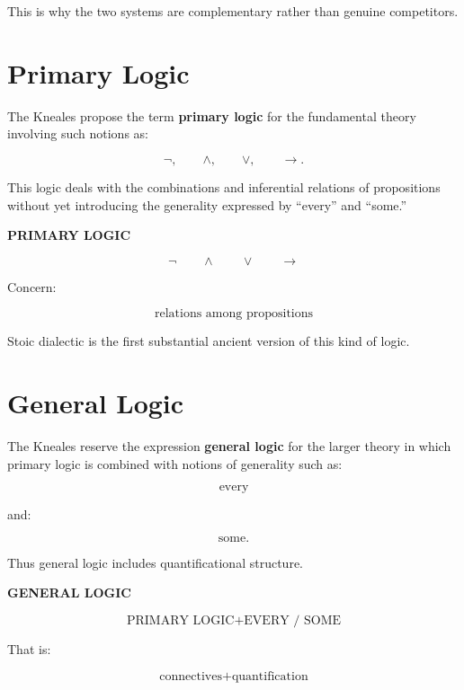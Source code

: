 \documentclass[11pt]{article}
\begin{document}
This is why the two systems are complementary rather than
genuine competitors.

\section{Primary Logic}

The Kneales propose the term \textbf{primary logic} for the
fundamental theory involving such notions as:

\[
\neg,
\qquad
\land,
\qquad
\lor,
\qquad
\rightarrow.
\]

This logic deals with the combinations and inferential relations
of propositions without yet introducing the generality expressed
by ``every'' and ``some.''

\begin{whiteboard}
\textbf{PRIMARY LOGIC}

\[
\boxed{
\neg
\qquad
\land
\qquad
\lor
\qquad
\rightarrow
}
\]

Concern:

\[
\text{relations among propositions}
\]
\end{whiteboard}

Stoic dialectic is the first substantial ancient version of this
kind of logic.

\section{General Logic}

The Kneales reserve the expression \textbf{general logic} for the
larger theory in which primary logic is combined with notions of
generality such as:

\[
\text{every}
\]

and:

\[
\text{some}.
\]

Thus general logic includes quantificational structure.

\begin{whiteboard}
\textbf{GENERAL LOGIC}

\[
\boxed{
\text{PRIMARY LOGIC}
+
\text{EVERY / SOME}
}
\]

That is:

\[
\text{connectives}
+
\text{quantification}
\]
\end{whiteboard}
\end{document}
